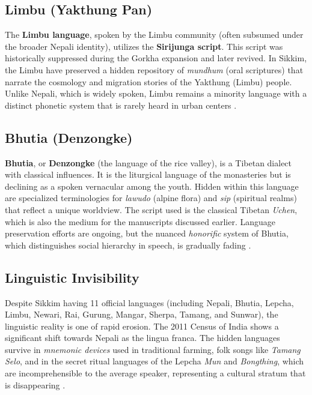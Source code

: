 \documentclass[12pt]{article}
\begin{document}
\subsection{Limbu (Yakthung Pan)}
The \textbf{Limbu language}, spoken by the Limbu community (often subsumed under the broader Nepali identity), utilizes the \textbf{Sirijunga script}. This script was historically suppressed during the Gorkha expansion and later revived. In Sikkim, the Limbu have preserved a hidden repository of \textit{mundhum} (oral scriptures) that narrate the cosmology and migration stories of the Yakthung (Limbu) people. Unlike Nepali, which is widely spoken, Limbu remains a minority language with a distinct phonetic system that is rarely heard in urban centers \cite{subba1999}.

\subsection{Bhutia (Denzongke)}
\textbf{Bhutia}, or \textbf{Denzongke} (the language of the rice valley), is a Tibetan dialect with classical influences. It is the liturgical language of the monasteries but is declining as a spoken vernacular among the youth. Hidden within this language are specialized terminologies for \textit{lawudo} (alpine flora) and \textit{sip} (spiritual realms) that reflect a unique worldview. The script used is the classical Tibetan \textit{Uchen}, which is also the medium for the manuscripts discussed earlier. Language preservation efforts are ongoing, but the nuanced \textit{honorific} system of Bhutia, which distinguishes social hierarchy in speech, is gradually fading \cite{shakya2010}.

\subsection{Linguistic Invisibility}
Despite Sikkim having 11 official languages (including Nepali, Bhutia, Lepcha, Limbu, Newari, Rai, Gurung, Mangar, Sherpa, Tamang, and Sunwar), the linguistic reality is one of rapid erosion. The 2011 Census of India shows a significant shift towards Nepali as the lingua franca. The hidden languages survive in \textit{mnemonic devices} used in traditional farming, folk songs like \textit{Tamang Selo}, and in the secret ritual languages of the Lepcha \textit{Mun} and \textit{Bongthing}, which are incomprehensible to the average speaker, representing a cultural stratum that is disappearing \cite{gurung2020}.
\end{document}

